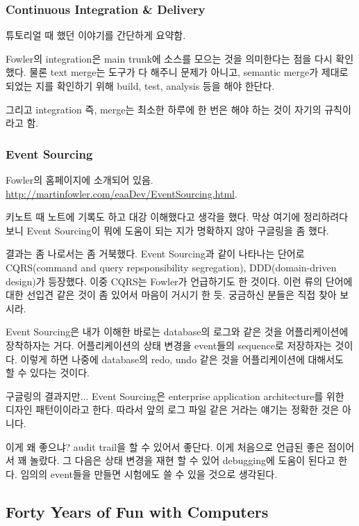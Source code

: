 \documentclass[11pt]{article}
\begin{document}
\subsubsection{Continuous Integration \& Delivery}
 
튜토리얼 때 했던 이야기를 간단하게 요약함. 
 
Fowler의 integration은 main trunk에 소스를 모으는 것을 의미한다는 점을
다시 확인했다. 물론 text merge는 도구가 다 해주니 문제가 아니고,
semantic merge가 제대로 되었는 지를 확인하기 위해 build, test,
analysis 등을 해야 한단다.
 
그리고 integration 즉, merge는 최소한 하루에 한 번은 해야 하는 것이
자기의 규칙이라고 함.
 
\subsubsection{Event Sourcing}
 
Fowler의 홈페이지에 소개되어 있음.
\url{http://martinfowler.com/eaaDev/EventSourcing.html}.
 
키노트 때 노트에 기록도 하고 대강 이해했다고 생각을 했다. 막상 여기에
정리하려다 보니 Event Sourcing이 뭐에 도움이 되는 지가 명확하지 않아
구글링을 좀 했다.
 
결과는 좀 나로서는 좀 거북했다. Event Sourcing과 같이 나타나는 단어로
CQRS(command and query repsponsibility segregation), DDD(domain-driven
design)가 등장했다. 이중 CQRS는 Fowler가 언급하기도 한 것이다. 이런
류의 단어에 대한 선입견 같은 것이 좀 있어서 마음이 거시기 한
듯. 궁금하신 분들은 직접 찾아 보시라.
 
Event Sourcing은 내가 이해한 바로는 database의 로그와 같은 것을
어플리케이션에 장착하자는 거다. 어플리케이션의 상태 변경을 event들의
sequence로 저장하자는 것이다. 이렇게 하면 나중에 database의 redo, undo
같은 것을 어플리케이션에 대해서도 할 수 있다는 것이다.
 
구글링의 결과지만... Event Sourcing은 enterprise application
architecture를 위한 디자인 패턴이이라고 한다. 따라서 앞의 로그 파일
같은 거라는 얘기는 정확한 것은 아니다.
 
이게 왜 좋으냐? audit trail을 할 수 있어서 좋단다. 이게 처음으로 언급된
좋은 점이어서 꽤 놀랐다. 그 다음은 상태 변경을 재현 할 수 있어
debugging에 도움이 된다고 한다. 임의의 event들을 만들면 시험에도 쓸 수
있을 것으로 생각된다.

\subsection{Forty Years of Fun with Computers}
\end{document}
